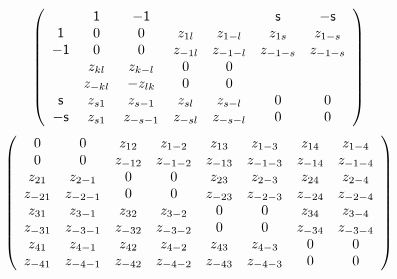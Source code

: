 \documentclass[aps,preprint]{revtex4}%
\begin{document}
\begin{equation}
\left(
\begin{array}
[c]{ccccccc}
& \mathsf{1} & \mathsf{-1} &  &  & \mathsf{s} & \mathsf{-s}\\
\mathsf{1} & 0 & 0 & z_{1l} & z_{1-l} & z_{1s} & z_{1-s}\\
\mathsf{-1} & 0 & 0 & z_{-1l} & z_{-1-l} & z_{-1-s} & z_{-1-s}\\
& z_{kl} & z_{k-l} & 0 & 0 &  & \\
& z_{-kl} & -z_{lk} & 0 & 0 &  & \\
\mathsf{s} & z_{s1} & z_{s-1} & z_{sl} & z_{s-l} & 0 & 0\\
\mathsf{-s} & z_{s1} & z_{-s-1} & z_{-sl} & z_{-s-l} & 0 & 0
\end{array}
\right)
\end{equation}%
\begin{equation}
\left(
\begin{array}
[c]{cccccccc}%
0 & 0 & z_{12} & z_{1-2} & z_{13} & z_{1-3} & z_{14} & z_{1-4}\\
0 & 0 & z_{-12} & z_{-1-2} & z_{-13} & z_{-1-3} & z_{-14} & z_{-1-4}\\
z_{21} & z_{2-1} & 0 & 0 & z_{23} & z_{2-3} & z_{24} & z_{2-4}\\
z_{-21} & z_{-2-1} & 0 & 0 & z_{-23} & z_{-2-3} & z_{-24} & z_{-2-4}\\
z_{31} & z_{3-1} & z_{32} & z_{3-2} & 0 & 0 & z_{34} & z_{3-4}\\
z_{-31} & z_{-3-1} & z_{-32} & z_{-3-2} & 0 & 0 & z_{-34} & z_{-3-4}\\
z_{41} & z_{4-1} & z_{42} & z_{4-2} & z_{43} & z_{4-3} & 0 & 0\\
z_{-41} & z_{-4-1} & z_{-42} & z_{-4-2} & z_{-43} & z_{-4-3} & 0 & 0
\end{array}
\right)
\end{equation}%
\end{document}
